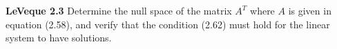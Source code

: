 \textbf{LeVeque 2.3}
Determine the null space of the matrix $A^T$ where $A$ is given in equation (2.58), and verify that the condition (2.62)
must hold for the linear system to have solutions.

\begin{solution}\ \\\\
\end{solution}